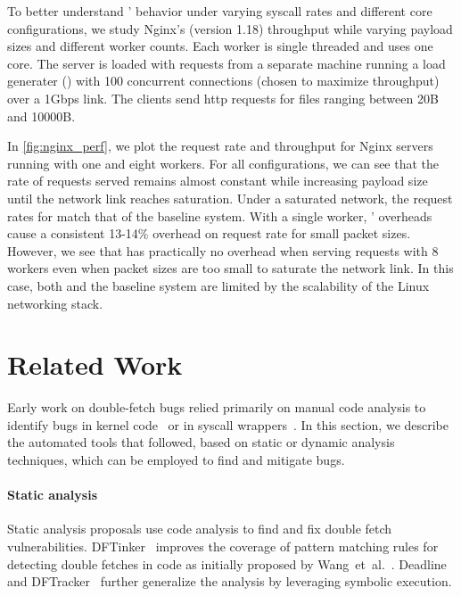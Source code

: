 \documentclass[letterpaper,twocolumn,10pt]{article}
\begin{document}
To better understand \midas' behavior under varying syscall 
rates and different core configurations, we study Nginx's (version 1.18) 
throughput while varying payload sizes and different worker counts.
Each worker is single threaded and uses one core.
The server is loaded with requests from a separate machine running 
a load generater () with 100 concurrent 
connections (chosen to maximize throughput) over a 1Gbps link.
The clients send http requests for files ranging between 20B and
10000B.

In \autoref{fig:nginx_perf}, we plot the request rate and throughput
for Nginx servers running with one and eight workers.
For all configurations, we can see that the rate of requests served 
remains almost constant while increasing payload size until the network 
link reaches saturation.
Under a saturated network, the request rates for \midas match that 
of the baseline system.
With a single worker, \midas' overheads cause a consistent 13-14\% 
overhead on request rate for small packet sizes.
However, we see that \midas has practically no overhead when serving 
requests with 8 workers even when packet sizes are too small to 
saturate the network link.
In this case, both \midas and the baseline system are limited by the
scalability of the Linux networking stack.

\section{Related Work}

Early work on double-fetch bugs relied primarily on manual 
code analysis to identify bugs in kernel code~\cite{YangCSS12}
or in syscall wrappers~\cite{watson2007exploiting}. 
In this section, we describe the automated tools that followed, 
based on static or dynamic analysis techniques, which can be employed 
to find and mitigate \tocttou bugs.

\paragraph{Static analysis}
%
Static analysis proposals use code analysis to find and fix double fetch
vulnerabilities.
DFTinker~\cite{dftinker} improves the coverage of pattern matching rules 
for detecting double fetches in code as initially proposed by Wang~et~al.~\cite{wang2017double}.
Deadline~\cite{deadline} and DFTracker~\cite{wang2019dftracker} further 
generalize the analysis by leveraging symbolic execution.
\end{document}
